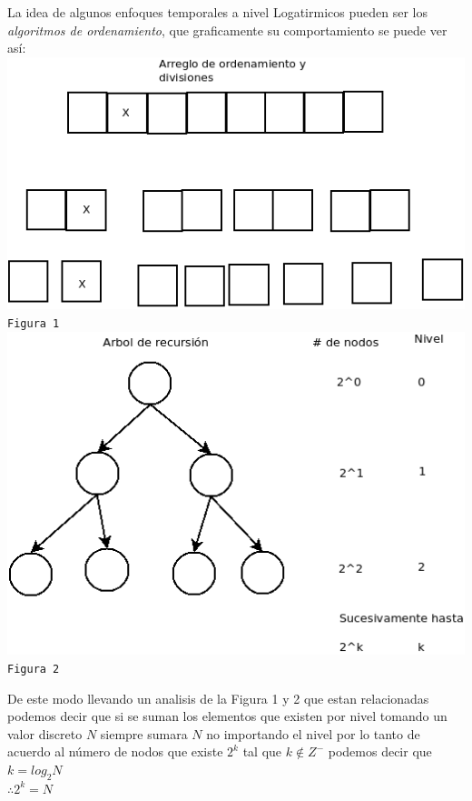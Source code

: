 \documentclass[10pt,executivepaper]{article}
\newcommand\tab[1][1cm]{\hspace*{#1}}
\begin{document}
\begin{center}
  La idea de algunos enfoques temporales a nivel Logatirmicos pueden ser los \textit{algoritmos de ordenamiento}, que graficamente su comportamiento se puede ver así:
  \includegraphics[scale=0.8]{draws/enfoqueTemporal1.png}\\
  \texttt{Figura 1}
  \includegraphics[scale=0.8]{draws/enfoqueTemporal.png}\\
  \texttt{Figura 2}
\end{center}
De este modo llevando un analisis de la Figura 1 y 2 que estan relacionadas podemos decir que si se suman los elementos que existen por nivel tomando un valor discreto $N$ siempre sumara $N$ no importando el nivel por lo tanto de acuerdo al número de nodos que existe $2^k$ tal que $k \notin Z^-$ podemos decir que $k= log_2{N}$ \\\tab$\therefore 2^k = N$
\end{document}

